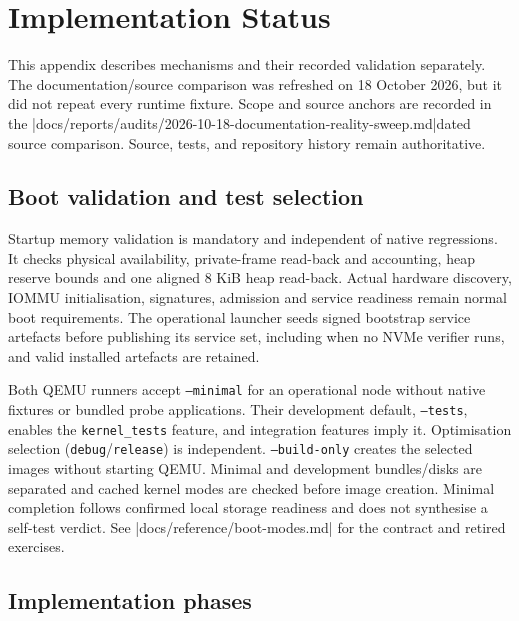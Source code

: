 \chapter{Implementation Status}

This appendix describes mechanisms and their recorded validation separately.
The documentation/source comparison was refreshed on 18 October 2026, but it did not
repeat every runtime fixture. Scope and source anchors are recorded in
the \repofiletext|docs/reports/audits/2026-10-18-documentation-reality-sweep.md|{dated source comparison}.
Source, tests, and repository history remain authoritative.

\section{Boot validation and test selection}

Startup memory validation is mandatory and independent of native regressions.
It checks physical availability, private-frame read-back and accounting, heap
reserve bounds and one aligned 8 KiB heap read-back. Actual hardware discovery,
IOMMU initialisation, signatures, admission and service readiness remain normal
boot requirements. The operational launcher seeds signed bootstrap service
artefacts before publishing its service set, including when no NVMe verifier
runs, and valid installed artefacts are retained.

Both QEMU runners accept \texttt{--minimal} for an operational node without
native fixtures or bundled probe applications. Their development default,
\texttt{--tests}, enables the \texttt{kernel\_tests} feature, and integration features
imply it. Optimisation selection (\texttt{debug}/\texttt{release}) is independent.
\texttt{--build-only} creates the selected images without starting QEMU.
Minimal and development bundles/disks are separated and cached kernel modes
are checked before image creation. Minimal completion follows confirmed local
storage readiness and does not synthesise a self-test verdict. See
\repofile|docs/reference/boot-modes.md| for the contract and retired exercises.

\section{Implementation phases}


